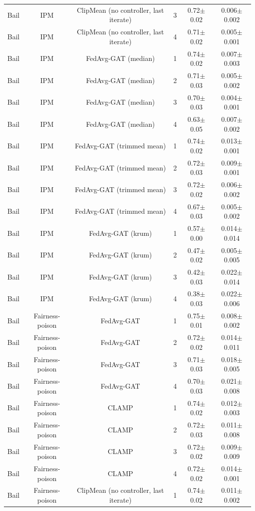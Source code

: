 \begin{table}[tbp]
\begin{tabular}{lccccc}
Bail & IPM & ClipMean (no controller, last iterate) & 3 & 0.72$\pm$0.02 & 0.006$\pm$0.002 \\
Bail & IPM & ClipMean (no controller, last iterate) & 4 & 0.71$\pm$0.02 & 0.005$\pm$0.001 \\
Bail & IPM & FedAvg-GAT (median) & 1 & 0.74$\pm$0.02 & 0.007$\pm$0.003 \\
Bail & IPM & FedAvg-GAT (median) & 2 & 0.71$\pm$0.03 & 0.005$\pm$0.002 \\
Bail & IPM & FedAvg-GAT (median) & 3 & 0.70$\pm$0.03 & 0.004$\pm$0.001 \\
Bail & IPM & FedAvg-GAT (median) & 4 & 0.63$\pm$0.05 & 0.007$\pm$0.002 \\
Bail & IPM & FedAvg-GAT (trimmed mean) & 1 & 0.74$\pm$0.02 & 0.013$\pm$0.001 \\
Bail & IPM & FedAvg-GAT (trimmed mean) & 2 & 0.72$\pm$0.03 & 0.009$\pm$0.001 \\
Bail & IPM & FedAvg-GAT (trimmed mean) & 3 & 0.72$\pm$0.02 & 0.006$\pm$0.002 \\
Bail & IPM & FedAvg-GAT (trimmed mean) & 4 & 0.67$\pm$0.03 & 0.005$\pm$0.002 \\
Bail & IPM & FedAvg-GAT (krum) & 1 & 0.57$\pm$0.00 & 0.014$\pm$0.014 \\
Bail & IPM & FedAvg-GAT (krum) & 2 & 0.47$\pm$0.02 & 0.005$\pm$0.005 \\
Bail & IPM & FedAvg-GAT (krum) & 3 & 0.42$\pm$0.03 & 0.022$\pm$0.014 \\
Bail & IPM & FedAvg-GAT (krum) & 4 & 0.38$\pm$0.03 & 0.022$\pm$0.006 \\
Bail & Fairness-poison & FedAvg-GAT & 1 & 0.75$\pm$0.01 & 0.008$\pm$0.002 \\
Bail & Fairness-poison & FedAvg-GAT & 2 & 0.72$\pm$0.02 & 0.014$\pm$0.011 \\
Bail & Fairness-poison & FedAvg-GAT & 3 & 0.71$\pm$0.03 & 0.018$\pm$0.005 \\
Bail & Fairness-poison & FedAvg-GAT & 4 & 0.70$\pm$0.03 & 0.021$\pm$0.008 \\
Bail & Fairness-poison & CLAMP & 1 & 0.74$\pm$0.02 & 0.012$\pm$0.003 \\
Bail & Fairness-poison & CLAMP & 2 & 0.72$\pm$0.03 & 0.011$\pm$0.008 \\
Bail & Fairness-poison & CLAMP & 3 & 0.72$\pm$0.02 & 0.009$\pm$0.009 \\
Bail & Fairness-poison & CLAMP & 4 & 0.72$\pm$0.02 & 0.014$\pm$0.001 \\
Bail & Fairness-poison & ClipMean (no controller, last iterate) & 1 & 0.74$\pm$0.02 & 0.011$\pm$0.002 \\

\end{tabular}
\end{table}

